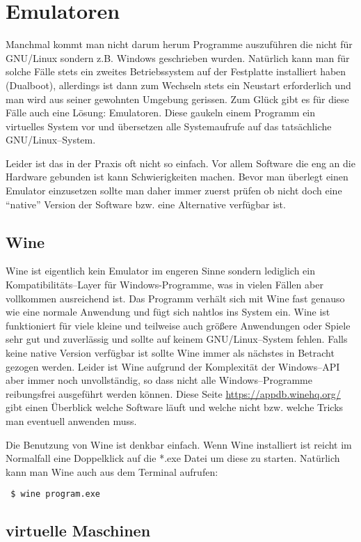 \section{Emulatoren}
Manchmal kommt man nicht darum herum Programme auszuführen die nicht für GNU/Linux sondern z.B. Windows geschrieben wurden. Natürlich kann man für solche Fälle stets ein zweites Betriebssystem auf der Festplatte installiert haben (Dualboot), allerdings ist dann zum Wechseln stets ein Neustart erforderlich und man wird aus seiner gewohnten Umgebung gerissen. Zum Glück gibt es für diese Fälle auch eine Lösung: Emulatoren. Diese gaukeln einem Programm ein virtuelles System vor und übersetzen alle Systemaufrufe auf das tatsächliche GNU/Linux--System.\par
Leider ist das in der Praxis oft nicht so einfach. Vor allem Software die eng an die Hardware gebunden ist kann Schwierigkeiten machen. Bevor man überlegt einen Emulator einzusetzen sollte man daher immer zuerst prüfen ob nicht doch eine ``native'' Version der Software bzw. eine Alternative verfügbar ist.\par

\subsection{Wine}
Wine ist eigentlich kein Emulator im engeren Sinne sondern lediglich ein Kompatibilitäts--Layer für Windows-Programme, was in vielen Fällen aber vollkommen ausreichend ist. Das Programm verhält sich mit Wine fast genauso wie eine normale Anwendung und fügt sich nahtlos ins System ein. Wine ist funktioniert für viele kleine und teilweise auch größere Anwendungen oder Spiele sehr gut und zuverlässig und sollte auf keinem GNU/Linux--System fehlen. Falls keine native Version verfügbar ist sollte Wine immer als nächstes in Betracht gezogen werden. Leider ist Wine aufgrund der Komplexität der Windows--API aber immer noch unvollständig, so dass nicht alle Windows--Programme reibungsfrei ausgeführt werden können. Diese Seite \url{https://appdb.winehq.org/} gibt einen Überblick welche Software läuft und welche nicht bzw. welche Tricks man eventuell anwenden muss.\par
Die Benutzung von Wine ist denkbar einfach. Wenn Wine installiert ist reicht im Normalfall eine Doppelklick auf die *.exe Datei um diese zu starten. Natürlich kann man Wine auch aus dem Terminal aufrufen:
\begin{lstlisting}
 $ wine program.exe
\end{lstlisting}

\subsection{virtuelle Maschinen}
